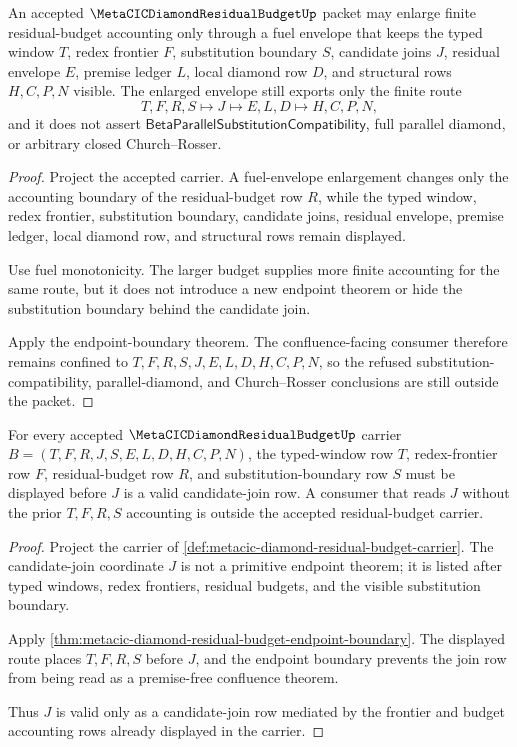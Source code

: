 \begin{theorem}
\label{thm:metacic-diamond-residual-budget-fuel-envelope}
An accepted $\MetaCICDiamondResidualBudgetUp$ packet may enlarge finite residual-budget accounting only through a fuel envelope that keeps the typed window $T$, redex frontier $F$, substitution boundary $S$, candidate joins $J$, residual envelope $E$, premise ledger $L$, local diamond row $D$, and structural rows $H,C,P,N$ visible. The enlarged envelope still exports only the finite route
$$
T,F,R,S \longmapsto J \longmapsto E,L,D \longmapsto H,C,P,N ,
$$
and it does not assert $\mathsf{BetaParallelSubstitutionCompatibility}$, full parallel diamond, or arbitrary closed Church--Rosser.
\end{theorem}
\begin{proof}
Project the accepted carrier. A fuel-envelope enlargement changes only the accounting boundary of the residual-budget row $R$, while the typed window, redex frontier, substitution boundary, candidate joins, residual envelope, premise ledger, local diamond row, and structural rows remain displayed.

Use fuel monotonicity. The larger budget supplies more finite accounting for the same route, but it does not introduce a new endpoint theorem or hide the substitution boundary behind the candidate join.

Apply the endpoint-boundary theorem. The confluence-facing consumer therefore remains confined to $T,F,R,S,J,E,L,D,H,C,P,N$, so the refused substitution-compatibility, parallel-diamond, and Church--Rosser conclusions are still outside the packet.
\end{proof}

\begin{theorem}
\label{thm:metacic-diamond-residual-budget-obligation-frontier-accounting}
For every accepted $\MetaCICDiamondResidualBudgetUp$ carrier
$B=(T,F,R,J,S,E,L,D,H,C,P,N)$, the typed-window row $T$, redex-frontier row
$F$, residual-budget row $R$, and substitution-boundary row $S$ must be
displayed before $J$ is a valid candidate-join row. A consumer that reads $J$
without the prior $T,F,R,S$ accounting is outside the accepted residual-budget
carrier.
\end{theorem}
\begin{proof}
Project the carrier of
\autoref{def:metacic-diamond-residual-budget-carrier}. The candidate-join
coordinate $J$ is not a primitive endpoint theorem; it is listed after typed
windows, redex frontiers, residual budgets, and the visible substitution
boundary.

Apply
\autoref{thm:metacic-diamond-residual-budget-endpoint-boundary}. The displayed
route places $T,F,R,S$ before $J$, and the endpoint boundary prevents the join
row from being read as a premise-free confluence theorem.

Thus $J$ is valid only as a candidate-join row mediated by the frontier and
budget accounting rows already displayed in the carrier.
\end{proof}

